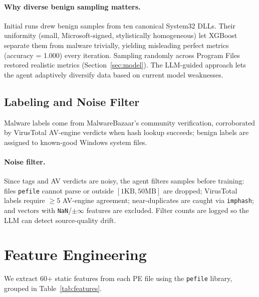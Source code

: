 \documentclass[12pt,a4paper]{article}
\begin{document}
\paragraph{Why diverse benign sampling matters.}
Initial runs drew benign samples from ten canonical System32 DLLs. Their uniformity (small, Microsoft-signed, stylistically homogeneous) let XGBoost separate them from malware trivially, yielding misleading perfect metrics (accuracy = 1.000) every iteration. Sampling randomly across Program Files restored realistic metrics (Section~\ref{sec:model}). The LLM-guided approach lets the agent adaptively diversify data based on current model weaknesses.

\subsection{Labeling and Noise Filter}
\label{sec:labeling}
Malware labels come from MalwareBazaar's community verification, corroborated by VirusTotal AV-engine verdicts when hash lookup succeeds; benign labels are assigned to known-good Windows system files.

\paragraph{Noise filter.} Since tags and AV verdicts are noisy, the agent filters samples before training: files \texttt{pefile} cannot parse or outside $[1\text{KB}, 50\text{MB}]$ are dropped; VirusTotal labels require $\geq 5$ AV-engine agreement; near-duplicates are caught via \texttt{imphash}; and vectors with \texttt{NaN}/$\pm\infty$ features are excluded. Filter counts are logged so the LLM can detect source-quality drift.

\section{Feature Engineering}
\label{sec:features}

We extract 60+ static features from each PE file using the \texttt{pefile} library, grouped in Table~\ref{tab:features}.
\end{document}
